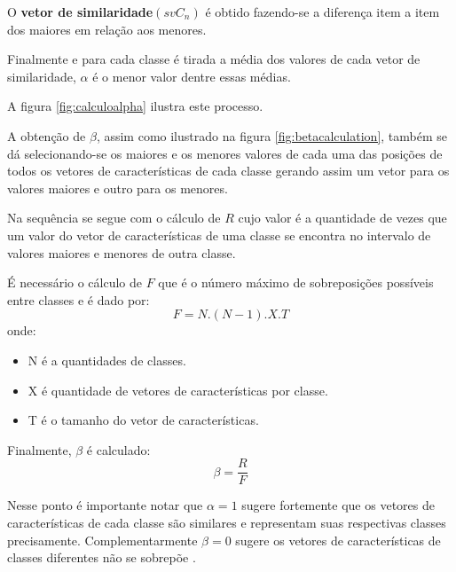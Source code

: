 \documentclass[a4paper,12pt,openright,oneside]{book}
\newenvironment{myenv}[1]
  {\begin{spacing}{#1}}
  {\end{spacing}}
\begin{document}
\begin{myenv}{1.5}
						\par O \textbf{vetor de similaridade}$(svC_n)$ é obtido fazendo-se a diferença item a item dos maiores em relação aos menores.
						
						\par Finalmente e para cada classe é tirada a média dos valores de cada vetor de similaridade, $\alpha$ é o menor valor dentre essas médias.
						
						\par A figura \ref{fig:calculoalpha} ilustra este processo.
						
						\par A obtenção de $\beta$, assim como ilustrado na figura \ref{fig:betacalculation}, também se dá selecionando-se os maiores e os menores valores de cada uma das posições de todos os vetores de características de cada classe gerando assim um vetor para os valores maiores e outro para os menores.
						
						\par Na sequência se segue com o cálculo de $R$ cujo valor é a quantidade de vezes que um valor do vetor de características de uma classe se encontra no intervalo de valores maiores e menores de outra classe.
						
						\par É necessário o cálculo de $F$ que é o número máximo de sobreposições possíveis entre classes e é dado por:
						\begin{equation}
								F=N.(N-1).X.T
						\end{equation}
						onde:
						\begin{itemize}
							\item N é a quantidades de classes.
							\item X é quantidade de vetores de características por classe.
							\item T é o tamanho do vetor de características.
						\end{itemize}

						\par Finalmente, $\beta$ é calculado:
						\begin{equation}
							\beta=\dfrac{R}{F}
						\end{equation}
					
						\par Nesse ponto é importante notar que $\alpha=1$ sugere fortemente que os vetores de características de cada classe são similares e representam suas respectivas classes precisamente. Complementarmente $\beta=0$ sugere os vetores de características de classes diferentes não se sobrepõe \cite{8588433}.
						

\end{myenv}
\end{document}
